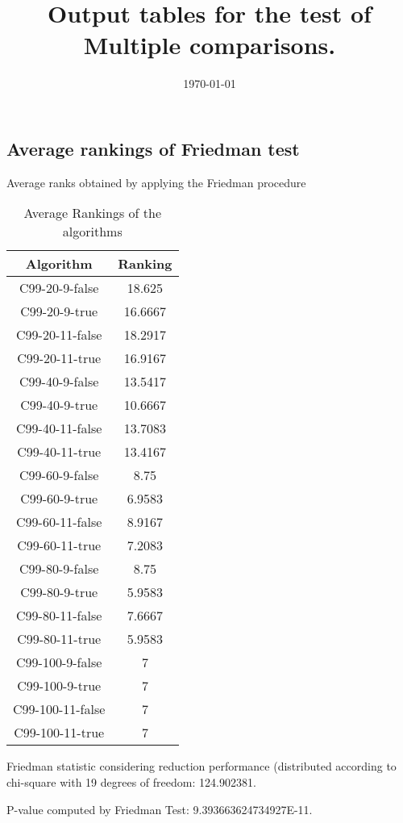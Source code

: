 \documentclass[a4paper,10pt]{article}
\title{Output tables for the test of Multiple comparisons.}
\author{}
\date{\today}
\begin{document}
\begin{landscape}
\pagestyle{empty}
\maketitle
\thispagestyle{empty}
\section{Average rankings of Friedman test}



Average ranks obtained by applying the Friedman procedure

\begin{table}[!htp]
\centering
\begin{tabular}{|c|c|}\hline
Algorithm&Ranking\\\hline
C99-20-9-false & 18.625\\
C99-20-9-true & 16.6667\\
C99-20-11-false & 18.2917\\
C99-20-11-true & 16.9167\\
C99-40-9-false & 13.5417\\
C99-40-9-true & 10.6667\\
C99-40-11-false & 13.7083\\
C99-40-11-true & 13.4167\\
C99-60-9-false & 8.75\\
C99-60-9-true & 6.9583\\
C99-60-11-false & 8.9167\\
C99-60-11-true & 7.2083\\
C99-80-9-false & 8.75\\
C99-80-9-true & 5.9583\\
C99-80-11-false & 7.6667\\
C99-80-11-true & 5.9583\\
C99-100-9-false & 7\\
C99-100-9-true & 7\\
C99-100-11-false & 7\\
C99-100-11-true & 7\\
\hline
\end{tabular}
\caption{Average Rankings of the algorithms}
\end{table}

Friedman statistic considering reduction performance (distributed according to chi-square with 19 degrees of freedom: 124.902381.

P-value computed by Friedman Test: 9.393663624734927E-11.\newline




\end{landscape}
\end{document}
